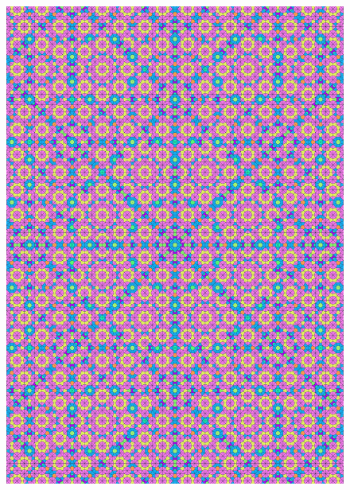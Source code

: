 \documentclass[text.tex]{subfiles}
\begin{document}
\begin{figure}[h!]
\centering
\includegraphics[width=1\textwidth]{img/results/circle8/quasi_circle_174302_(10067_-4167alpha_4).pdf}
\end{figure}
\end{document}
